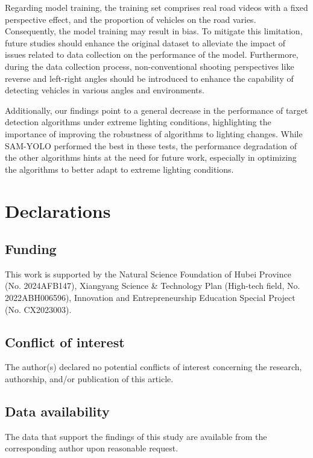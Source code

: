 \documentclass[aic]{iosart2x}
\begin{document}
Regarding model training, the training set comprises real road videos with a fixed perspective effect, and the proportion of vehicles on the road varies.  Consequently, the model training may result in bias.  To mitigate this limitation, future studies should enhance the original dataset to alleviate the impact of issues related to data collection on the performance of the model.  Furthermore, during the data collection process, non-conventional shooting perspectives like reverse and left-right angles should be introduced to enhance the capability of detecting vehicles in various angles and environments.

Additionally, our findings point to a general decrease in the performance of target detection algorithms under extreme lighting conditions, highlighting the importance of improving the robustness of algorithms to lighting changes. While SAM-YOLO performed the best in these tests, the performance degradation of the other algorithms hints at the need for future work, especially in optimizing the algorithms to better adapt to extreme lighting conditions.

\backmatter

\section*{Declarations}

\subsection*{Funding}

This work is supported by the Natural Science Foundation of Hubei Province (No. 2024AFB147), Xiangyang Science \& Technology Plan (High-tech field, No. 2022ABH006596), Innovation and Entrepreneurship Education Special Project (No. CX2023003).

\subsection*{Conflict of interest}

The author(s) declared no potential conflicts of interest concerning the research, authorship, and/or publication of this article.

\subsection*{Data availability}

The data that support the findings of this study are available from the corresponding author upon reasonable request.

\nocite{*}

\end{document}
